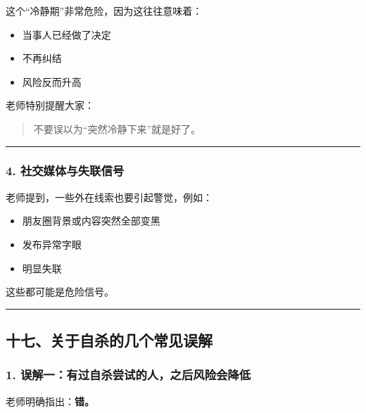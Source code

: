\documentclass[
  chinese,
  9pt,
  a4paper,
]{ctexart}
\providecommand{\tightlist}{%
  \setlength{\itemsep}{0pt}\setlength{\parskip}{0pt}}
\begin{document}
这个``冷静期''非常危险，因为这往往意味着：

\begin{itemize}
\tightlist
\item
  当事人已经做了决定
\item
  不再纠结
\item
  风险反而升高
\end{itemize}

老师特别提醒大家：

\begin{quote}
不要误以为``突然冷静下来''就是好了。
\end{quote}

\begin{center}\rule{0.5\linewidth}{0.5pt}\end{center}

\subsubsection{4.
社交媒体与失联信号}\label{ux793eux4ea4ux5a92ux4f53ux4e0eux5931ux8054ux4fe1ux53f7}

老师提到，一些外在线索也要引起警觉，例如：

\begin{itemize}
\tightlist
\item
  朋友圈背景或内容突然全部变黑
\item
  发布异常字眼
\item
  明显失联
\end{itemize}

这些都可能是危险信号。

\begin{center}\rule{0.5\linewidth}{0.5pt}\end{center}

\subsection{十七、关于自杀的几个常见误解}\label{ux5341ux4e03ux5173ux4e8eux81eaux6740ux7684ux51e0ux4e2aux5e38ux89c1ux8befux89e3}

\subsubsection{1.
误解一：有过自杀尝试的人，之后风险会降低}\label{ux8befux89e3ux4e00ux6709ux8fc7ux81eaux6740ux5c1dux8bd5ux7684ux4ebaux4e4bux540eux98ceux9669ux4f1aux964dux4f4e}

老师明确指出：\textbf{错。}
\end{document}

